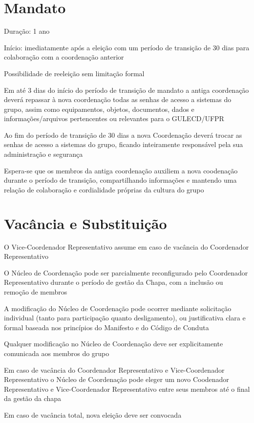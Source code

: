 \documentclass[
  12pt,          %
  a4paper,       %
  oneside,       %
  brazil         %
]{article}
\begin{document}
\section{Mandato}

\begin{conduta}
	\item Duração: 1 ano
	\item Início: imediatamente após a eleição com um período de transição de 30 dias para colaboração com a coordenação anterior
	\item Possibilidade de reeleição sem limitação formal
	\item Em até 3 dias do início do período de transição de mandato a antiga coordenação deverá repassar à nova coordenação todas as senhas de acesso 
	a sistemas do grupo, assim como equipamentos, objetos, documentos, dados e informações/arquivos pertencentes ou relevantes para o GULECD/UFPR
	\item Ao fim do período de transição de 30 dias a nova Coordenação deverá trocar as senhas de acesso a sistemas do grupo, ficando inteiramente responsável
	pela sua administração e segurança
	\item Espera-se que os membros da antiga coordenação auxiliem a nova coodenação durante o período de transição, compartilhando informações e 
	mantendo uma relação de colaboração e cordialidade próprias da cultura do grupo
\end{conduta}

\section{Vacância e Substituição}

\begin{conduta}
	\item O Vice-Coordenador Representativo assume em caso de vacância do Coordenador Representativo
	\item O Núcleo de Coordenação pode ser parcialmente reconfigurado pelo Coordenador Representativo durante o período de gestão da Chapa, com a inclusão ou
	remoção de membros
	\item A modificação do Núcleo de Coordenação pode ocorrer mediante solicitação individual (tanto para participação quanto desligamento), ou justificativa 
	clara e formal baseada nos princípios do Manifesto e do Código de Conduta
	\item Qualquer modificação no Núcleo de Coordenação deve ser explicitamente comunicada aos membros do grupo
	\item Em caso de vacância do Coordenador Representativo e Vice-Coordenador Representativo o Núcleo de Coordenação pode eleger um novo Coodenador Representativo e 
	Vice-Coordenador Representativo entre seus membros até o final da gestão da chapa
	\item Em caso de vacância total, nova eleição deve ser convocada
\end{conduta}
\end{document}
